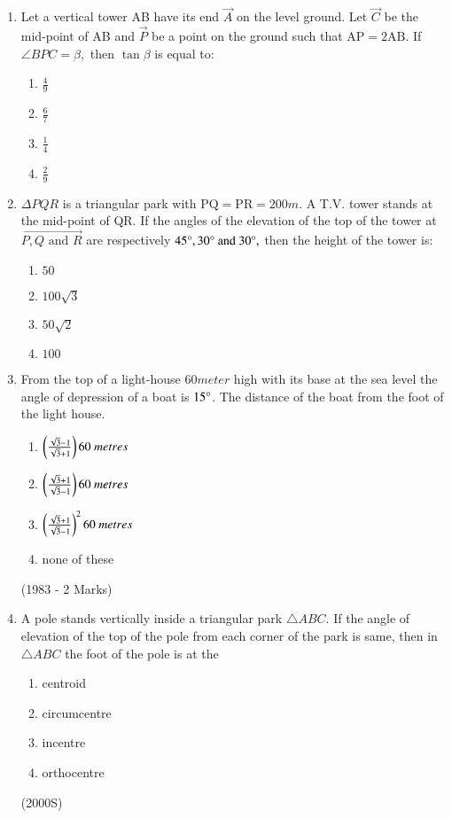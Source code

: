 \begin{enumerate}[label=\thesubsection.\arabic*,ref=\thesubsection.\theenumi]
\item Let a vertical tower AB have its end $\vec{A}$ on the level ground. Let $\vec{C}$ be the  mid-point of AB and $\vec{P}$ be a point on the ground such that $\text{AP}=2\text{AB}.$ If $\angle{BPC}=\beta,$ then $\tan \beta$ is equal to: \hfill{}
\begin{multicols}{4}
\begin{enumerate}
        \item $\frac{4}{9}$                    
        \item $\frac{6}{7}$ 
        \item $\frac{1}{4}$ 
        \item $\frac{2}{9}$
\end{enumerate}
\end{multicols} 

\item $\Delta{PQR}$ is a triangular park with $\text{PQ}=\text{PR}=200m$. A T.V. tower stands at the mid-point of QR. If the angles of the elevation of the top of the tower at $\vec{P,Q \text{ and } R}$ are respectively $45\degree , 30\degree \text{ and } 30\degree,$ then the height of the tower  is: \hfill{}
\begin{multicols}{4}
\begin{enumerate}
        \item $50$                    
        \item $100\sqrt{3}$ 
        \item $50\sqrt{2}$ 
        \item $100$
\end{enumerate}
\end{multicols} 
    \item From the top of a light-house $60 meter$ high with its base at the sea level the angle of depression of a boat is  $15\degree$. The distance of the boat from the foot of the light house.
	    \begin{multicols}{2}    
\begin{enumerate}
    \item $\brak{\frac{\sqrt{3}-1}{\sqrt{3}+1}}60\ metres $
    \item $\brak{\frac{\sqrt{3}+1}{\sqrt{3}-1}}60\ metres $
    \item $\left(\frac{\sqrt{3}+1}{\sqrt{3}-1}\right)^2 60\ metres $
    \item none of these 
\end{enumerate}
	    \end{multicols}
		 \hfill (1983 - 2 Marks)
\item A pole stands vertically inside a triangular park $\triangle ABC$. If the angle of elevation of the top of the pole from each corner of the park is same, then in $\triangle ABC$ the foot of the pole is at the
\begin{enumerate}
\item centroid
\item circumcentre
\item incentre
\item orthocentre
\end{enumerate}
\hfill (2000S)


\end{enumerate}
